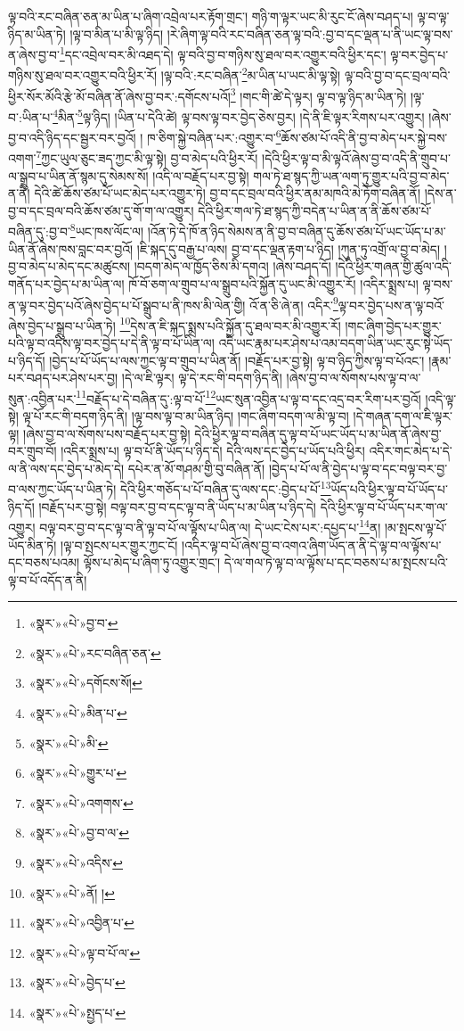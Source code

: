 ལྟ་བའི་རང་བཞིན་ཅན་མ་ཡིན་པ་ཞིག་འབྲེལ་པར་རྟོག་གྲང་། གཉི་ག་ལྟར་ཡང་མི་རུང་ངོ་ཞེས་བཤད་པ། ལྟ་བ་ལྟ་ཉིད་མ་ཡིན་ཏེ། །ལྟ་བ་མིན་པ་མི་ལྟ་ཉིད། །རེ་ཞིག་ལྟ་བའི་རང་བཞིན་ཅན་ལྟ་བའི་:བྱ་བ་དང་ལྡན་པ་ནི་ཡང་ལྟ་བས་ན་ཞེས་བྱ་བ་\footnote{«སྣར་»«པེ་»བྱ་བ་}དང་འབྲེལ་བར་མི་འཐད་དེ། ལྟ་བའི་བྱ་བ་གཉིས་སུ་ཐལ་བར་འགྱུར་བའི་ཕྱིར་དང་། ལྟ་བར་བྱེད་པ་གཉིས་སུ་ཐལ་བར་འགྱུར་བའི་ཕྱིར་རོ། །ལྟ་བའི་:རང་བཞིན་\footnote{«སྣར་»«པེ་»རང་བཞིན་ཅན་}མ་ཡིན་པ་ཡང་མི་ལྟ་སྟེ། ལྟ་བའི་བྱ་བ་དང་བྲལ་བའི་ཕྱིར་སོར་མོའི་རྩེ་མོ་བཞིན་ནོ་ཞེས་བྱ་བར་:དགོངས་པའོ།\footnote{«སྣར་»«པེ་»དགོངས་སོ།} །གང་གི་ཚེ་དེ་ལྟར། ལྟ་བ་ལྟ་ཉིད་མ་ཡིན་ཏེ། །ལྟ་བ་:ཡིན་པ་\footnote{«སྣར་»«པེ་»མིན་པ་}མིན་\footnote{«སྣར་»«པེ་»མི་}ལྟ་ཉིད། །ཡིན་པ་དེའི་ཚེ། ལྟ་བས་ལྟ་བར་བྱེད་ཅེས་བྱར། །དེ་ནི་ཇི་ལྟར་རིགས་པར་འགྱུར། །ཞེས་བྱ་བ་འདི་ཉིད་དང་སྦྱར་བར་བྱའོ། །
ཁ་ཅིག་སྐྱེ་བཞིན་པར་:འགྱུར་བ་\footnote{«སྣར་»«པེ་»གྱུར་པ་}ཆོས་ཙམ་པོ་འདི་ནི་བྱ་བ་མེད་པར་སྐྱེ་བས་འགག་\footnote{«སྣར་»«པེ་»འགགས་}ཀྱང་ཡུལ་ཅུང་ཟད་ཀྱང་མི་ལྟ་སྟེ། བྱ་བ་མེད་པའི་ཕྱིར་རོ། །དེའི་ཕྱིར་ལྟ་བ་མི་ལྟའོ་ཞེས་བྱ་བ་འདི་ནི་གྲུབ་པ་ལ་སྒྲུབ་པ་ཡིན་ནོ་སྙམ་དུ་སེམས་སོ། །འདི་ལ་བརྗོད་པར་བྱ་སྟེ། གལ་ཏེ་ཐ་སྙད་ཀྱི་ཡན་ལག་ཏུ་གྱུར་པའི་བྱ་བ་མེད་ན་ནི། དེའི་ཚེ་ཆོས་ཙམ་པོ་ཡང་མེད་པར་འགྱུར་ཏེ། བྱ་བ་དང་བྲལ་བའི་ཕྱིར་ནམ་མཁའི་མེ་ཏོག་བཞིན་ནོ། །དེས་ན་བྱ་བ་དང་བྲལ་བའི་ཆོས་ཙམ་དུ་གོ་ག་ལ་འགྱུར། དེའི་ཕྱིར་གལ་ཏེ་ཐ་སྙད་ཀྱི་བདེན་པ་ཡིན་ན་ནི་ཆོས་ཙམ་པོ་བཞིན་དུ་:བྱ་བ་\footnote{«སྣར་»«པེ་»བྱ་བ་ལ་}ཡང་ཁས་ལོང་ལ། །འོན་ཏེ་དེ་ཁོ་ན་ཉིད་སེམས་ན་ནི་བྱ་བ་བཞིན་དུ་ཆོས་ཙམ་པོ་ཡང་ཡོད་པ་མ་ཡིན་ནོ་ཞེས་ཁས་བླང་བར་བྱའོ། །ཇི་སྐད་དུ་བརྒྱ་པ་ལས། བྱ་བ་དང་ལྡན་རྟག་པ་ཉིད། །ཀུན་ཏུ་འགྲོ་ལ་བྱ་བ་མེད། །བྱ་བ་མེད་པ་མེད་དང་མཚུངས། །བདག་མེད་ལ་ཁྱོད་ཅིས་མི་དགའ། །ཞེས་བཤད་དོ། །དེའི་ཕྱིར་གཞན་གྱི་ཚུལ་འདི་གནོད་པར་བྱེད་པ་མ་ཡིན་ལ། ཁོ་བོ་ཅག་ལ་གྲུབ་པ་ལ་སྒྲུབ་པའི་སྐྱོན་དུ་ཡང་མི་འགྱུར་རོ། །འདིར་སྨྲས་པ། ལྟ་བས་ན་ལྟ་བར་བྱེད་པའོ་ཞེས་བྱེད་པ་པོ་སྒྲུབ་པ་ནི་ཁས་མི་ལེན་གྱི། འོ་ན་ཅི་ཞེ་ན། འདིར་\footnote{«སྣར་»«པེ་»འདིས་}ལྟ་བར་བྱེད་པས་ན་ལྟ་བའོ་ཞེས་བྱེད་པ་སྒྲུབ་པ་ཡིན་ཏེ། \footnote{«སྣར་»«པེ་»ནོ། ། }དེས་ན་ཇི་སྐད་སྨྲས་པའི་སྐྱོན་དུ་ཐལ་བར་མི་འགྱུར་རོ། །གང་ཞིག་བྱེད་པར་གྱུར་པའི་ལྟ་བ་འདིས་ལྟ་བར་བྱེད་པ་དེ་ནི་ལྟ་བ་པོ་ཡིན་ལ། འདི་ཡང་རྣམ་པར་ཤེས་པ་འམ་བདག་ཡིན་ཡང་རུང་སྟེ་ཡོད་པ་ཉིད་དོ། །བྱེད་པ་པོ་ཡོད་པ་ལས་ཀྱང་ལྟ་བ་གྲུབ་པ་ཡིན་ནོ། །བརྗོད་པར་བྱ་སྟེ། ལྟ་བ་ཉིད་ཀྱིས་ལྟ་བ་པོའང་། །རྣམ་པར་བཤད་པར་ཤེས་པར་བྱ། །དེ་ལ་ཇི་ལྟར། ལྟ་དེ་རང་གི་བདག་ཉིད་ནི། །ཞེས་བྱ་བ་ལ་སོགས་པས་ལྟ་བ་ལ་སུན་:འབྱིན་པར་\footnote{«སྣར་»«པེ་»འབྱིན་པ་}བརྗོད་པ་དེ་བཞིན་དུ་:ལྟ་བ་པོ་\footnote{«སྣར་»«པེ་»ལྟ་བ་པོ་ལ་}ཡང་སུན་འབྱིན་པ་ལྟ་བ་དང་འདྲ་བར་རིག་པར་བྱའོ། །འདི་ལྟ་སྟེ། ལྟ་པོ་རང་གི་བདག་ཉིད་ནི། །ལྟ་བས་ལྟ་བ་མ་ཡིན་ཉིད། །གང་ཞིག་བདག་ལ་མི་ལྟ་བ། །དེ་གཞན་དག་ལ་ཇི་ལྟར་ལྟ། །ཞེས་བྱ་བ་ལ་སོགས་པས་བརྗོད་པར་བྱ་སྟེ། དེའི་ཕྱིར་ལྟ་བ་བཞིན་དུ་ལྟ་བ་པོ་ཡང་ཡོད་པ་མ་ཡིན་ནོ་ཞེས་བྱ་བར་གྲུབ་བོ། །འདིར་སྨྲས་པ། ལྟ་བ་པོ་ནི་ཡོད་པ་ཉིད་དེ། དེའི་ལས་དང་བྱེད་པ་ཡོད་པའི་ཕྱིར། འདིར་གང་མེད་པ་དེ་ལ་ནི་ལས་དང་བྱེད་པ་མེད་དེ། དཔེར་ན་མོ་གཤམ་གྱི་བུ་བཞིན་ནོ། །བྱེད་པ་པོ་ལ་ནི་བྱེད་པ་ལྟ་བ་དང་བལྟ་བར་བྱ་བ་ལས་ཀྱང་ཡོད་པ་ཡིན་ཏེ། དེའི་ཕྱིར་གཅོད་པ་པོ་བཞིན་དུ་ལས་དང་:བྱེད་པ་པོ་\footnote{«སྣར་»«པེ་»བྱེད་པ་}ཡོད་པའི་ཕྱིར་ལྟ་བ་པོ་ཡོད་པ་ཉིད་དོ། །བརྗོད་པར་བྱ་སྟེ། བལྟ་བར་བྱ་བ་དང་ལྟ་བ་ནི་ཡོད་པ་མ་ཡིན་པ་ཉིད་དེ། དེའི་ཕྱིར་ལྟ་བ་པོ་ཡོད་པར་ག་ལ་འགྱུར། བལྟ་བར་བྱ་བ་དང་ལྟ་བ་ནི་ལྟ་བ་པོ་ལ་ལྟོས་པ་ཡིན་ལ། དེ་ཡང་ངེས་པར་:དཔྱད་པ་\footnote{«སྣར་»«པེ་»སྤྱད་པ་}ན། །མ་སྤངས་ལྟ་པོ་ཡོད་མིན་ཏེ། །ལྟ་བ་སྤངས་པར་གྱུར་ཀྱང་ངོ། །འདིར་ལྟ་བ་པོ་ཞེས་བྱ་བ་འགའ་ཞིག་ཡོད་ན་ནི་དེ་ལྟ་བ་ལ་ལྟོས་པ་དང་བཅས་པའམ། ལྟོས་པ་མེད་པ་ཞིག་ཏུ་འགྱུར་གྲང་། དེ་ལ་གལ་ཏེ་ལྟ་བ་ལ་ལྟོས་པ་དང་བཅས་པ་མ་སྤངས་པའི་ལྟ་བ་པོ་འདོད་ན་ནི། 